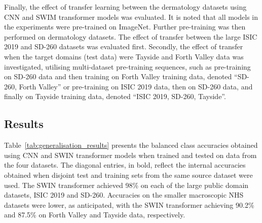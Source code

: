 Finally, the effect of transfer learning between the dermatology datasets using CNN and SWIM transformer models was evaluated. It is noted that all models in the experiments were pre-trained on ImageNet. Further pre-training was then performed on dermatology datasets. The effect of transfer between the large ISIC 2019 and SD-260 datasets was evaluated first. Secondly, the effect of transfer when the target domains (test data) were Tayside and Forth Valley data was investigated, utilising multi-dataset pre-training sequences, such as pre-training on SD-260 data and then training on Forth Valley training data, denoted “SD-260, Forth Valley” or pre-training on ISIC 2019 data, then on SD-260 data, and finally on Tayside training data, denoted “ISIC 2019, SD-260, Tayside”.


\subsection{Results}
\label{subsec:generalisation_results}
Table~\ref{tab:generalisation_results} presents the balanced class accuracies obtained using CNN and SWIN transformer models when trained and tested on data from the four datasets. The diagonal entries, in bold, reflect the internal accuracies obtained when disjoint test and training sets from the same source dataset were used. The SWIN transformer achieved 98\% on each of the large public domain datasets, ISIC 2019 and SD-260. Accuracies on the smaller macroscopic NHS datasets were lower, as anticipated, with the SWIN transformer achieving 90.2\% and 87.5\% on Forth Valley and Tayside data, respectively.


